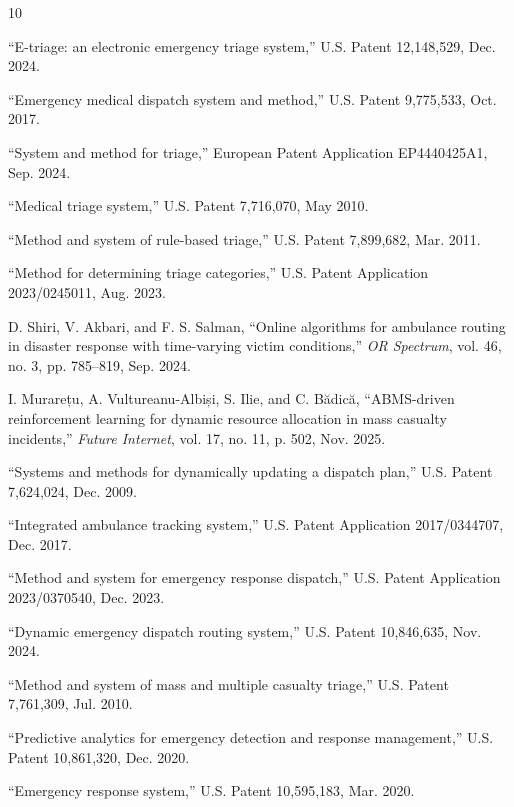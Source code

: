 \documentclass[conference]{IEEEtran}
\begin{document}
\small
\begin{thebibliography}{10}

  ``E-triage: an electronic emergency triage system,'' U.S. Patent 12,148,529, Dec. 2024.

  ``Emergency medical dispatch system and method,'' U.S. Patent 9,775,533, Oct. 2017.

  ``System and method for triage,'' European Patent Application EP4440425A1, Sep. 2024.

  ``Medical triage system,'' U.S. Patent 7,716,070, May 2010.

  ``Method and system of rule-based triage,'' U.S. Patent 7,899,682, Mar. 2011.

  ``Method for determining triage categories,'' U.S. Patent Application 2023/0245011, Aug. 2023.

D. Shiri, V. Akbari, and F. S. Salman, ``Online algorithms for ambulance routing in disaster response with time-varying victim conditions,'' \emph{OR Spectrum}, vol. 46, no. 3, pp. 785--819, Sep. 2024.

I. Murarețu, A. Vultureanu-Albiși, S. Ilie, and C. Bădică, ``ABMS-driven reinforcement learning for dynamic resource allocation in mass casualty incidents,'' \emph{Future Internet}, vol. 17, no. 11, p. 502, Nov. 2025.

  ``Systems and methods for dynamically updating a dispatch plan,'' U.S. Patent 7,624,024, Dec. 2009.

  ``Integrated ambulance tracking system,'' U.S. Patent Application 2017/0344707, Dec. 2017.

  ``Method and system for emergency response dispatch,'' U.S. Patent Application 2023/0370540, Dec. 2023.

  ``Dynamic emergency dispatch routing system,'' U.S. Patent 10,846,635, Nov. 2024.

  ``Method and system of mass and multiple casualty triage,'' U.S. Patent 7,761,309, Jul. 2010.

  ``Predictive analytics for emergency detection and response management,'' U.S. Patent 10,861,320, Dec. 2020.

  ``Emergency response system,'' U.S. Patent 10,595,183, Mar. 2020.


\end{thebibliography}
\end{document}
